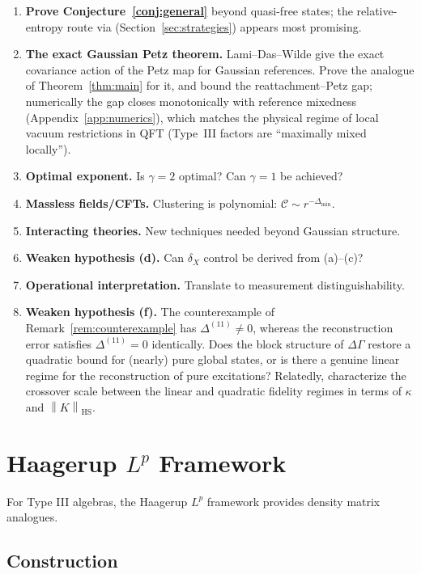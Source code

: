 \documentclass[11pt,a4paper]{article}
\theoremstyle{plain}
\theoremstyle{definition}
\theoremstyle{remark}
\newcommand{\hsnorm}[1]{\left\lVert #1 \right\rVert_{\mathrm{HS}}}
\begin{document}
\begin{enumerate}
\item \textbf{Prove Conjecture~\ref{conj:general}} beyond quasi-free states; the
relative-entropy route via \cite{FHSW22} (Section~\ref{sec:strategies}) appears
most promising.
\item \textbf{The exact Gaussian Petz theorem.} Lami--Das--Wilde
\cite{LamiDasWilde18} give the exact covariance action of the Petz map for
Gaussian references. Prove the analogue of Theorem~\ref{thm:main} for it, and
bound the reattachment--Petz gap; numerically the gap closes monotonically with
reference mixedness (Appendix~\ref{app:numerics}), which matches the physical
regime of local vacuum restrictions in QFT (Type~III factors are ``maximally
mixed locally'').
\item \textbf{Optimal exponent.} Is $\gamma = 2$ optimal? Can $\gamma = 1$ be
achieved?
\item \textbf{Massless fields/CFTs.} Clustering is polynomial:
$\mathcal{C} \sim r^{-\Delta_{\min}}$.
\item \textbf{Interacting theories.} New techniques needed beyond Gaussian
structure.
\item \textbf{Weaken hypothesis (d).} Can $\delta_X$ control be derived from
(a)--(c)?
\item \textbf{Operational interpretation.} Translate to measurement
distinguishability.
\item \textbf{Weaken hypothesis (f).} The counterexample of
Remark~\ref{rem:counterexample} has $\Delta^{(11)} \neq 0$, whereas the
reconstruction error satisfies $\Delta^{(11)} = 0$ identically. Does the block
structure of $\Delta\Gamma$ restore a quadratic bound for (nearly) pure global
states, or is there a genuine linear regime for the reconstruction of pure
excitations? Relatedly, characterize the crossover scale between the linear and
quadratic fidelity regimes in terms of $\kappa$ and $\hsnorm{K}$.
\end{enumerate}

\appendix

\section{Haagerup $L^p$ Framework}\label{app:haagerup}

For Type III algebras, the Haagerup $L^p$ framework provides density matrix
analogues.

\subsection{Construction}
\end{document}
